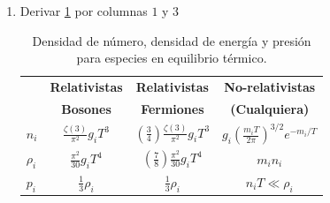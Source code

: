 \documentclass[a4paper]{article}
\begin{document}
\begin{enumerate}
\begin{equation}
h(\tau) = \begin{cases} 
\cot(\tau) & k = 1 \\ 
1/\tau & k = 0 \\ 
\coth(\tau) & k = -1 
\end{cases}
\tag{43}
\label{eq:43}
\end{equation}

\begin{equation}
a(\tau) \propto \begin{cases} 
\sin(\tau) & k = 1 \\ 
\tau & k = 0 \\ 
\sinh(\tau) & k = -1 
\end{cases}
\tag{44}
\label{eq:44}
\end{equation}

\begin{equation}
t(\tau) \propto \begin{cases} 
1 - \cos(\tau) & k = 1 \\ 
\tau^2/2 & k = 0 \\ 
\cosh(\tau) - 1 & k = -1 
\end{cases}
\tag{45}
\label{eq:45}
\end{equation}
	
	\item Derivar \ref{tab:2} por columnas $1$ y $3$
	
	\begin{table}[h]
\centering
\caption{Densidad de número, densidad de energía y presión para especies en equilibrio térmico.}
\label{tab:2}
\begin{tabular}{lccc}
\toprule
 & \textbf{Relativistas} & \textbf{Relativistas} & \textbf{No-relativistas} \\
 & \textbf{Bosones} & \textbf{Fermiones} & \textbf{(Cualquiera)} \\ \midrule
$n_i$ & $\frac{\zeta(3)}{\pi^2} g_i T^3$ & $\left(\frac{3}{4}\right) \frac{\zeta(3)}{\pi^2} g_i T^3$ & $g_i \left(\frac{m_i T}{2\pi}\right)^{3/2} e^{-m_i/T}$ \\ [2ex]
$\rho_i$ & $\frac{\pi^2}{30} g_i T^4$ & $\left(\frac{7}{8}\right) \frac{\pi^2}{30} g_i T^4$ & $m_i n_i$ \\ [2ex]
$p_i$ & $\frac{1}{3} \rho_i$ & $\frac{1}{3} \rho_i$ & $n_i T \ll \rho_i$ \\ \bottomrule
\end{tabular}
\end{table}

\end{enumerate}
\end{document}
